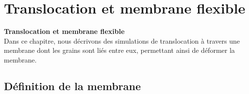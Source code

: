 
\chapter{Translocation et membrane flexible}
\label{chapitrewholemembrane}

\cleardoublepage

{\Large\textbf{{Translocation et membrane flexible}}}\\


\lettrine[loversize=0.6,lraise=0.1,findent=0.5em,nindent=0em]{D}{}ans ce chapitre, nous décrivons des simulations de translocation à travers une membrane dont les grains sont liés entre eux, permettant ainsi de déformer la membrane.\\
\minitoc

\newpage




\section{Définition de la membrane}




